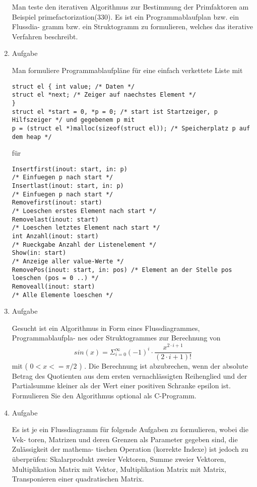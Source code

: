 \documentclass[12pt,a4paper]{scrreprt}
\begin{document}
\begin{enumerate}
Man teste den iterativen Algorithmus zur Bestimmung der Primfaktoren am
Beispiel primefactorization(330). Es ist ein Programmablaufplan bzw. ein Flussdia-
gramm bzw. ein Struktogramm zu formulieren, welches das iterative Verfahren beschreibt.

\item Aufgabe %

Man formuliere Programmablaufpläne für eine einfach verkettete Liste mit

\begin{lstlisting}
struct el { int value; /* Daten */
struct el *next; /* Zeiger auf naechstes Element */
}
struct el *start = 0, *p = 0; /* start ist Startzeiger, p Hilfszeiger */ und gegebenem p mit
p = (struct el *)malloc(sizeof(struct el)); /* Speicherplatz p auf dem heap */
\end{lstlisting}

für

\begin{lstlisting}
Insertfirst(inout: start, in: p)
/* Einfuegen p nach start */
Insertlast(inout: start, in: p)
/* Einfuegen p nach start */
Removefirst(inout: start)
/* Loeschen erstes Element nach start */
Removelast(inout: start)
/* Loeschen letztes Element nach start */
int Anzahl(inout: start)
/* Rueckgabe Anzahl der Listenelement */
Show(in: start)
/* Anzeige aller value-Werte */
RemovePos(inout: start, in: pos) /* Element an der Stelle pos loeschen (pos = 0 ..) */
Removeall(inout: start)
/* Alle Elemente loeschen */
\end{lstlisting}

\item Aufgabe %

Gesucht ist ein Algorithmus in Form eines Flussdiagrammes, Programmablaufpla-
nes oder Struktogrammes zur Berechnung von
\[
sin(x)=\Sigma_{i=0}^{\infty} (-1)^i \cdot \frac{x^{2 \cdot i+1}}{(2 \cdot i + 1)!}
\]
mit ( $0 < x <= \pi/2$ ) . Die Berechnung ist abzubrechen, wenn der absolute Betrag des Quotienten
aus dem ersten vernachlässigten Reihenglied und der Partialsumme kleiner als der Wert einer
positiven Schranke epsilon ist. Formulieren Sie den Algorithmus optional als C-Programm.

\item Aufgabe %

Es ist je ein Flussdiagramm für folgende Aufgaben zu formulieren, wobei die Vek-
toren, Matrizen und deren Grenzen als Parameter gegeben sind, die Zulässigkeit der mathema-
tischen Operation (korrekte Indexe) ist jedoch zu überprüfen:
Skalarprodukt zweier Vektoren, Summe zweier Vektoren, Multiplikation Matrix mit Vektor,
Multiplikation Matrix mit Matrix, Transponieren einer quadratischen Matrix.

\end{enumerate}
\end{document}
